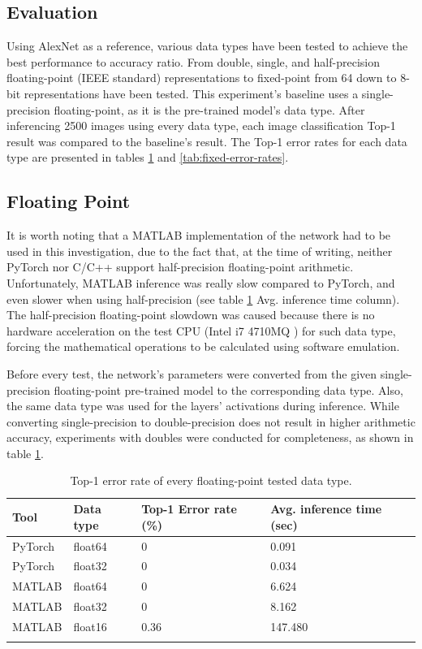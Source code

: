 \subsection{Evaluation}
Using AlexNet as a reference, various data types have been tested to achieve the best performance to accuracy ratio. From double, single, and half-precision floating-point (IEEE standard) representations to fixed-point from 64 down to 8-bit representations have been tested. This experiment's baseline uses a single-precision floating-point, as it is the pre-trained model's data type. After inferencing 2500 images using every data type, each image classification Top-1 result was compared to the baseline's result. The Top-1 error rates for each data type are presented in tables \ref{tab:floats-error-rates} and \ref{tab:fixed-error-rates}.

\subsection{Floating Point}
It is worth noting that a MATLAB implementation of the network had to be used in this investigation, due to the fact that, at the time of writing, neither PyTorch nor C/C++ support half-precision floating-point arithmetic. Unfortunately, MATLAB inference was really slow compared to PyTorch, and even slower when using half-precision (see table \ref{tab:floats-error-rates} Avg. inference time column). The half-precision floating-point slowdown was caused because there is no hardware acceleration on the test CPU (Intel i7 4710MQ \cite{Intel-i7-4710MQ-Processor}) for such data type, forcing the mathematical operations to be calculated using software emulation.

Before every test, the network's parameters were converted from the given single-precision floating-point pre-trained model to the corresponding data type. Also, the same data type was used for the layers' activations during inference. While converting single-precision to double-precision does not result in higher arithmetic accuracy, experiments with doubles were conducted for completeness, as shown in table \ref{tab:floats-error-rates}.

\begin{table}[H]
	\caption{Top-1 error rate of every floating-point tested data type.}
	\label{tab:floats-error-rates}
	\centering
	\begin{tabular}{p{2cm} p{2cm} p{3cm} p{3cm}}
		\toprule
		\textbf{Tool} & \textbf{Data type} & \textbf{Top-1 Error rate (\%)} & \textbf{Avg. inference time (sec)} \\
		\midrule
			PyTorch & float64	& 0			& 0.091 \\
			PyTorch & float32	& 0			& 0.034 \\
			MATLAB 	& float64	& 0			& 6.624 \\
			MATLAB 	& float32	& 0			& 8.162 \\
			MATLAB 	& float16 	& 0.36  	& 147.480 \\
		\bottomrule\\
	\end{tabular}
\end{table}

